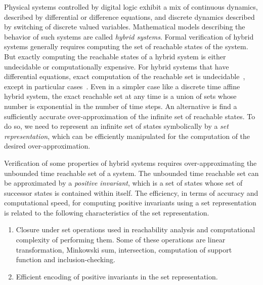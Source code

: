 
Physical systems controlled by digital logic exhibit a mix of
continuous dynamics, described by differential or difference
equations, and discrete dynamics described by switching of discrete
valued variables.  Mathematical models describing the behavior of such
systems are called \emph{hybrid systems}.  Formal verification of
hybrid systems generally requires computing the set of reachable
states of the system.  But exactly computing the reachable states of a
hybrid system is either undecidable or computationally expensive.  For
hybrid systems that have differential equations, exact computation of
the reachable set is undecidable~\cite{alur1995algorithmic}, except in
particular cases~\cite{lafferriere1998decidable}.  Even in a simpler
case like a discrete time affine hybrid system, the exact reachable
set at any time is a union of sets whose number is exponential in the
number of time steps.  An alternative is find a sufficiently accurate
over-approximation of the infinite set of reachable states.  To do so,
we need to represent an infinite set of states symbolically by a {\it
set representation}, which can be efficiently manipulated for the
computation of the desired over-approximation.


Verification of some properties of hybrid systems requires
over-approximating the unbounded time reachable set of a system.  The
unbounded time reachable set can be approximated by a \emph{positive
invariant}, which is a set of states whose set of successor states is
contained within itself.  The efficiency, in terms of accuracy and
computational speed, for computing positive invariants using a set
representation is related to the following characteristics of the set
representation.
%
\begin{enumerate}
\item Closure under set operations used in reachability analysis and computational complexity of
performing them.  Some of these operations are linear transformation,
Minkowski sum, intersection, computation of support function and
inclusion-checking.
\item Efficient encoding of positive invariants in the set representation.
\end{enumerate}


